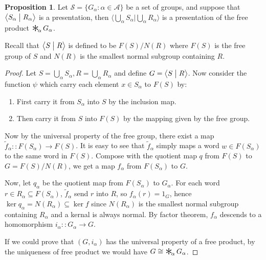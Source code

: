 \documentclass[a4paper,titlepage]{article}
\theoremstyle{remark}
\theoremstyle{definition}
\theoremstyle{theorem}
\newtheorem{proposition}{Proposition}
\DeclareMathOperator*{\freeprod}{\raisebox{-0.4ex}{\scalebox{2}{$\ast$}}\!}
\begin{document}
  \begin{proposition}
    Let $\mathcal{S} = \{ G_\alpha : \alpha \in \mathcal{A} \}$ be a set of groups, and suppose that
    $\big\langle S_\alpha \bigm| R_\alpha \big\rangle$ is a presentation, then 
    $\Big\langle \bigcup\limits_\alpha S_\alpha \mathrel{\Big|} \bigcup\limits_\alpha R_\alpha \Big\rangle$
    is a presentation of the free product $\freeprod_\alpha G_\alpha$.
  \end{proposition}

  Recall that $\big\langle S \bigm| R \big\rangle$ is defined to be $F(S) / N(R)$ where $F(S)$ is
  the free group of $S$ and $N(R)$ is the smallest normal subgroup containing $R$.

  \begin{proof}
    Let $S = \bigcup_\alpha S_\alpha, R = \bigcup_\alpha R_\alpha$ and define 
    $G = \big\langle S \bigm| R \big\rangle$. Now consider the function $\psi$ which
    carry each element $x \in S_\alpha$ to $F(S)$ by:
    \begin{enumerate}
      \item First carry it from $S_\alpha$ into $S$ by the inclusion map.
      \item Then carry it from $S$ into $F(S)$ by the mapping given by the free group.
    \end{enumerate}
    Now by the universal property of the free group, there exist a map 
    $\tilde{f}_\alpha :: F(S_\alpha) \to F(S)$. It is easy to see that $\tilde{f}_\alpha$
    simply maps a word $w \in F(S_\alpha)$ to the same word in $F(S)$.
    Compose with the quotient map $q$ from $F(S)$ to $G = F(S) / N(R)$, we get a map $f_\alpha$ from
    $F(S_\alpha)$ to $G$. 

    Now, let $q_\alpha$ be the quotient map from $F(S_\alpha)$ to $G_\alpha$.
    For each word $r \in R_\alpha \subseteq F(S_\alpha)$, $\tilde{f}_\alpha$ send $r$ into $R$,
    so $f_\alpha(r) = 1_G$, hence $\ker q_\alpha = N(R_\alpha) \subseteq \ker f$ since $N(R_\alpha)$ is the smallest
    normal subgroup containing $R_\alpha$ and a kernal is always normal. By factor theorem, $f_\alpha$
    descends to a homomorphism $i_\alpha :: G_\alpha \to G$.

    If we could prove that $(G, i_\alpha)$ has the universal property of a free product, by the uniqueness
    of free product we would have $G \cong \freeprod_\alpha G_\alpha$.


\end{proof}
\end{document}
